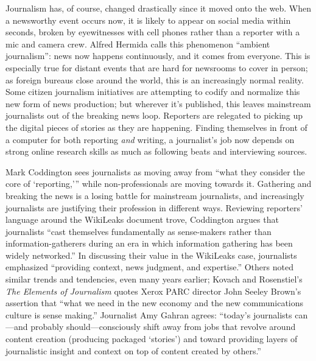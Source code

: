 Journalism has, of course, changed drastically since it moved onto the web. When a newsworthy event occurs now, it is likely to appear on social media within seconds, broken by eyewitnesses with cell phones rather than a reporter with a mic and camera crew. Alfred Hermida calls this phenomenon ``ambient journalism'': news now happens continuously, and it comes from everyone.\autocite{hermida_twittering_2010} This is especially true for distant events that are hard for newsrooms to cover in person; as foreign bureaus close around the world, this is an increasingly normal reality. Some citizen journalism initiatives are attempting to codify and normalize this new form of news production;\autocite[See][]{zuckerman_international_2010} but wherever it's published, this leaves mainstream journalists out of the breaking news loop. Reporters are relegated to picking up the digital pieces of stories as they are happening. Finding themselves in front of a computer for both reporting \emph{and} writing, a journalist's job now depends on strong online research skills as much as following beats and interviewing sources.

Mark Coddington sees journalists as moving away from ``what they consider the core of `reporting,'\thinspace'' while non-professionals are moving towards it.\autocite[682]{coddington_defending_2014} Gathering and breaking the news is a losing battle for mainstream journalists, and increasingly journalists are justifying their profession in different ways. Reviewing reporters' language around the WikiLeaks document trove, Coddington argues that journalists ``cast themselves fundamentally as sense-makers rather than information-gatherers during an era in which information gathering has been widely networked.''\autocite[678]{coddington_defending_2014} In discussing their value in the WikiLeaks case, journalists emphasized ``providing context, news judgment, and expertise.''\autocite[689]{coddington_defending_2014} Others noted similar trends and tendencies, even many years earlier; Kovach and Rosenstiel's \emph{The Elements of Journalism} quotes Xerox PARC director John Seeley Brown's assertion that ``what we need in the new economy and the new communications culture is sense making.''\autocite[19]{kovach_elements_2001} Journalist Amy Gahran agrees: ``today's journalists can---and probably should---consciously shift away from jobs that revolve around content creation (producing packaged `stories') and toward providing layers of journalistic insight and context on top of content created by others.''\autocite{gahran_swimming_2008}

